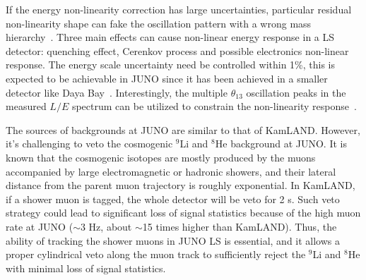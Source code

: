 
If the energy non-linearity correction has large uncertainties, particular residual non-linearity shape can fake the oscillation pattern with a wrong mass hierarchy~\cite{Qian-PRD13}. Three main effects can cause non-linear energy response in a LS detector: quenching effect, Cerenkov process and possible electronics non-linear response. The energy scale uncertainty need be controlled within 1\%, this is expected to be achievable in JUNO since it has been achieved in a smaller detector like Daya Bay~\cite{Zhang-Neutrino14}. Interestingly, the multiple $\theta_{13}$ oscillation peaks in the measured $L/E$ spectrum can be utilized to constrain the non-linearity response~\cite{Li-PRD13}.


The sources of backgrounds at JUNO are similar to that of KamLAND. However, it's challenging to veto the cosmogenic $^9$Li and $^8$He background at JUNO. It is known that the cosmogenic isotopes are mostly produced by the muons accompanied by large electromagnetic or hadronic showers, and their lateral distance from the parent muon trajectory is roughly exponential. In KamLAND, if a shower muon is tagged, the whole detector will be veto for 2 s. Such veto strategy could lead to significant loss of signal statistics because of the high muon rate at JUNO ($\sim$3 Hz, about $\sim$15 times higher than KamLAND). Thus, the ability of tracking the shower muons in JUNO LS is essential, and it allows a proper cylindrical veto along the muon track to sufficiently reject the $^9$Li and $^8$He with minimal loss of signal statistics.

